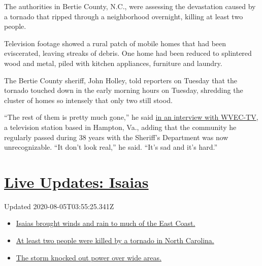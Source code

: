 The authorities in Bertie County, N.C., were assessing the devastation
caused by a tornado that ripped through a neighborhood overnight,
killing at least two people.

Television footage showed a rural patch of mobile homes that had been
eviscerated, leaving streaks of debris. One home had been reduced to
splintered wood and metal, piled with kitchen appliances, furniture and
laundry.

The Bertie County sheriff, John Holley, told reporters on Tuesday that
the tornado touched down in the early morning hours on Tuesday,
shredding the cluster of homes so intensely that only two still stood.

``The rest of them is pretty much gone,'' he said
\href{https://www.13newsnow.com/video/news/local/north-carolina/bertie-county-sheriff-john-holley-talks-about-fatality-in-north-carolina/291-99306d30-d640-4e9a-97fa-0221d565f5df}{in
an interview with WVEC-TV}, a television station based in Hampton, Va.,
adding that the community he regularly passed during 38 years with the
Sheriff's Department was now unrecognizable. ``It don't look real,'' he
said. ``It's sad and it's hard.''

\hypertarget{live-updates-isaias}{%
\section{\texorpdfstring{\href{https://www.nytimes.com/2020/08/04/us/isaias-storm-updates.html?action=click\&pgtype=Article\&state=default\&region=MAIN_CONTENT_1\&context=storylines_live_updates}{Live
Updates: Isaias}}{Live Updates: Isaias}}\label{live-updates-isaias}}

Updated 2020-08-05T03:55:25.341Z

\begin{itemize}
\tightlist
\item
  \href{https://www.nytimes.com/2020/08/04/us/isaias-storm-updates.html?action=click\&pgtype=Article\&state=default\&region=MAIN_CONTENT_1\&context=storylines_live_updates\#link-38d68049}{Isaias
  brought winds and rain to much of the East Coast.}
\item
  \href{https://www.nytimes.com/2020/08/04/us/isaias-storm-updates.html?action=click\&pgtype=Article\&state=default\&region=MAIN_CONTENT_1\&context=storylines_live_updates\#link-7961bdbc}{At
  least two people were killed by a tornado in North Carolina.}
\item
  \href{https://www.nytimes.com/2020/08/04/us/isaias-storm-updates.html?action=click\&pgtype=Article\&state=default\&region=MAIN_CONTENT_1\&context=storylines_live_updates\#link-3480f4a1}{The
  storm knocked out power over wide areas.}
\end{itemize}

